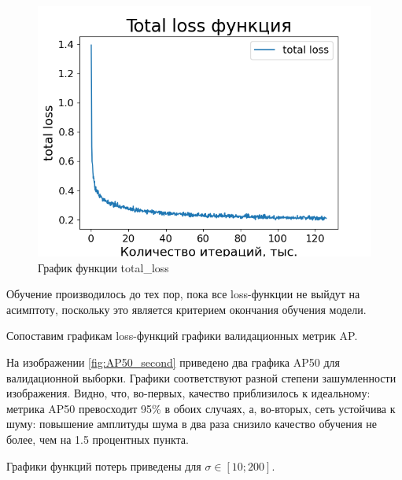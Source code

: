 \begin{figure}[h!] 
	\center
	\includegraphics [scale=0.8] {my_folder/images/total_loss_second}
	\caption{График функции total\_loss}
	\label{fig:total_loss}
\end{figure}

Обучение производилось до тех пор, пока все loss-функции не выйдут на асимптоту, поскольку это является критерием окончания обучения модели.

Сопоставим графикам loss-функций графики валидационных метрик AP.

На изображении \ref{fig:AP50_second} приведено два графика AP50 для валидационной выборки. Графики соответствуют разной степени зашумленности изображения. Видно, что, во-первых, качество приблизилось к идеальному: метрика AP50 превосходит 95\% в обоих случаях, а, во-вторых, сеть устойчива к шуму: повышение амплитуды шума в два раза снизило качество обучения не более, чем на 1.5 процентных пункта.

Графики функций потерь приведены для $\sigma \in [10; 200]$.

